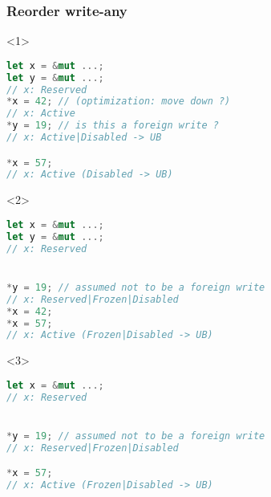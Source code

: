 \begin{frame}[fragile, t]
    \frametitle{{\cmark} Reorder write-any}
    \begin{onlyenv}<1>
        \begin{block}{}
            \begin{lstlisting}[language=rust, escapechar=@]
let x = &mut ...;
let y = &mut ...;
// x: Reserved
*x = 42; // (optimization: move down ?)
// x: Active
*y = 19; // is this a foreign write ?
// x: Active|Disabled -> UB

*x = 57;
// x: Active (Disabled -> UB)
            \end{lstlisting}
        \end{block}
    \end{onlyenv}
    \begin{onlyenv}<2>
        \begin{block}{}
            \begin{lstlisting}[language=rust, escapechar=@]
let x = &mut ...;
let y = &mut ...;
// x: Reserved


*y = 19; // assumed not to be a foreign write
// x: Reserved|Frozen|Disabled
*x = 42;
*x = 57;
// x: Active (Frozen|Disabled -> UB)
            \end{lstlisting}
        \end{block}
    \end{onlyenv}
    \begin{onlyenv}<3>
        \begin{block}{}
            \begin{lstlisting}[language=rust, escapechar=@]
let x = &mut ...;
// x: Reserved


*y = 19; // assumed not to be a foreign write
// x: Reserved|Frozen|Disabled

*x = 57;
// x: Active (Frozen|Disabled -> UB)
            \end{lstlisting}
        \end{block}
    \end{onlyenv}

\end{frame}

